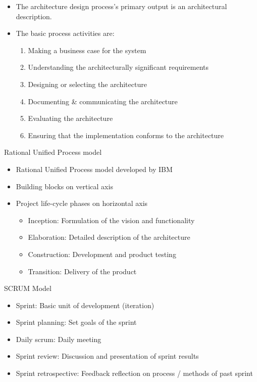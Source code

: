 \documentclass{article}
\begin{document}
\begin{itemize}
    \item The architecture design process's primary output is an architectural description.
    \item The basic process activities are:
          \begin{enumerate}
              \item Making a business case for the system
              \item Understanding the architecturally significant requirements
              \item Designing or selecting the architecture
              \item Documenting \& communicating the architecture
              \item Evaluating the architecture
              \item Ensuring that the implementation conforms to the architecture
          \end{enumerate}
\end{itemize}
Rational Unified Process model
\begin{itemize}
    \item Rational Unified Process model developed by IBM
    \item Building blocks on vertical axis
    \item Project life-cycle phases on horizontal axis
          \begin{itemize}
              \item Inception: Formulation of the vision and functionality
              \item Elaboration: Detailed description of the architecture
              \item Construction: Development and product testing
              \item Transition: Delivery of the product
          \end{itemize}
\end{itemize}
SCRUM Model
\begin{itemize}
    \item Sprint: Basic unit of development (iteration)
    \item Sprint planning: Set goals of the sprint
    \item Daily scrum: Daily meeting
    \item Sprint review: Discussion and presentation of sprint results
    \item Sprint retrospective: Feedback reflection on process / methods of past sprint
\end{itemize}
\end{document}

